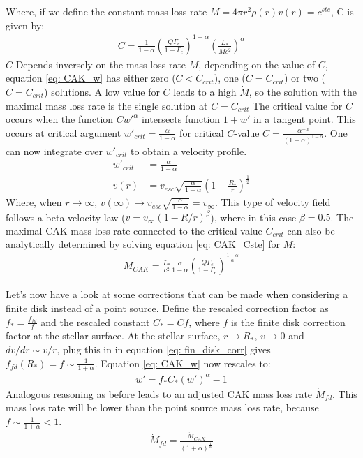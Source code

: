 Where, if we define the constant mass loss rate $\dot{M} = 4\pi r^2 \rho(r) v(r) = c^{ste}$, C is given by:
\begin{align}
C = \frac{1}{1-\alpha} \left(\frac{\bar{Q}\Gamma_e}{1-\Gamma_e} \right)^{1-\alpha} \left(\frac{L_*}{\dot{M}c^2}\right)^\alpha \label{eq: CAK_Cste}
\end{align}
$C$ Depends inversely on the mass loss rate $\dot{M}$, depending on the value of $C$, equation \ref{eq: CAK_w} has either zero ($C < C_{crit}$), one ($C = C_{crit}$) or two ($C = C_{crit}$) solutions. A low value for $C$ leads to a high $\dot{M}$, so the solution with the maximal mass loss rate is the single solution at $C = C_{crit}$ The critical value for $C$ occurs when the function $C w'^\alpha$ intersects function $1 + w'$ in a tangent point. This occurs at critical argument $w'_{crit} = \frac{\alpha}{1-\alpha}$ for critical $C$-value $C = \frac{\alpha^{-\alpha}}{(1-\alpha)^{1-\alpha}}$. One can now integrate over $w'_{crit}$ to obtain a velocity profile.
\begin{align}
w'_{crit} &= \frac{\alpha}{1-\alpha} \\
v(r) &= v_{esc} \sqrt{\frac{\alpha}{1-\alpha}} \left(1 - \frac{R_*}{r} \right)^\frac{1}{2}
\end{align}
Where, when $r\rightarrow\infty$, $v(\infty) \rightarrow v_{esc} \sqrt{\frac{\alpha}{1-\alpha}} = v_\infty$. This type of velocity field follows a beta velocity law ($v = v_\infty (1-R/r)^\beta$), where in this case $\beta = 0.5$. The maximal CAK mass loss rate connected to the critical value $C_{crit}$ can also be analytically determined by solving equation \ref{eq: CAK_Cste} for $\dot{M}$:
\begin{align}
\dot{M}_{CAK} = \frac{L_*}{c^2} \frac{\alpha}{1-\alpha}\left(\frac{\bar{Q}\Gamma_e}{1-\Gamma_e}\right)^{\frac{1-\alpha}{\alpha}}
\end{align}

Let's now have a look at some corrections that can be made when considering a finite disk instead of a point source. Define the rescaled correction factor as $f_* = \frac{f_{fd}}{f}$ and the rescaled constant $C_* = C f$, where $f$ is the finite disk correction factor at the stellar surface. At the stellar surface, $r \rightarrow R_*$, $v \rightarrow 0$ and $dv/dr \sim v/r$, plug this in in equation \ref{eq: fin_disk_corr} gives $f_{fd}(R_*) = f \sim \frac{1}{1+\alpha}$. Equation \ref{eq: CAK_w} now rescales to:
\begin{align}
w' = f_* C_* (w')^\alpha - 1 \label{eq: w_fd}
\end{align}
Analogous reasoning as before leads to an adjusted CAK mass loss rate $\dot{M}_{fd}$. This mass loss rate will be lower than the point source mass loss rate, because $f \sim \frac{1}{1+\alpha}  < 1$.
\begin{align}
\dot{M}_{fd} = \frac{\dot{M}_{CAK}}{(1+\alpha)^\frac{1}{\alpha}}
\end{align} 


